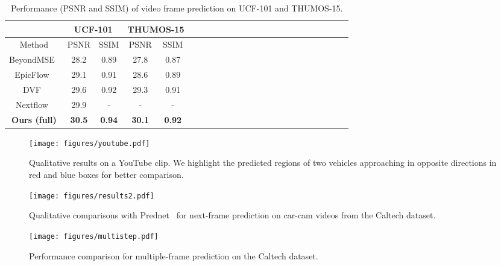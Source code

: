 \documentclass[10pt,twocolumn,letterpaper]{article}
\begin{document}
	\begin{table}[!tp]
		\centering\renewcommand{}\footnotesize
		\caption{Performance (PSNR and SSIM) of video frame prediction on UCF-101 and THUMOS-15.}\label{tab:ucf}
		\begin{tabular}{c|c|c|c|ccccccccccccccccccp{6em}p{5em}}
			\toprule
			& \multicolumn{2}{|c|}{UCF-101} &\multicolumn{2}{|c}{THUMOS-15}\\
			\hline
			Method & PSNR & SSIM  & PSNR & SSIM\\
			\hline
			BeyondMSE~\cite{mathieu2015deep} & {28.2} & {0.89} & {27.8} & {0.87}\\
			\hline
			EpicFlow~\cite{revaud2015epicflow} & {29.1} & {0.91} & {28.6} & {0.89}\\
			\hline
			DVF~\cite{liu2017video} & 29.6 & 0.92 & 29.3 & 0.91\\
			\hline
			Nextflow~\cite{sedaghat2016next} & 29.9 & - & - & - \\
			\hline
			\textbf{Ours (full)} & \textbf{30.5} & \textbf{0.94} & \textbf{30.1} & \textbf{0.92}\\
			\bottomrule
		\end{tabular}%
	\end{table}%
	
	\begin{figure}[!tp]
		\begin{center}
			\texttt{[image: figures/youtube.pdf]}
			\caption{Qualitative results on a YouTube clip. We highlight the predicted regions of two vehicles approaching in opposite directions in red and blue boxes for better comparison.} 
			\label{fig:Youtube}
		\end{center}
		\vspace{-10mm}
	\end{figure}
	\begin{figure*}[!tp]
		\begin{center}
			\texttt{[image: figures/results2.pdf]}
			\caption{Qualitative comparisons with Prednet~\cite{lotter2016deep} for next-frame prediction on car-cam videos from the Caltech dataset. } 
			\label{fig:results}
		\end{center}
		\vspace{-8mm}
	\end{figure*}	
	
	\begin{figure}[!tp]
		\begin{center}
			\texttt{[image: figures/multistep.pdf]}
			\caption{Performance comparison for multiple-frame prediction on the Caltech dataset.} 
			\label{fig:multistep}
		\end{center}
		\vspace{-8mm}
	\end{figure}
	
\end{document}
